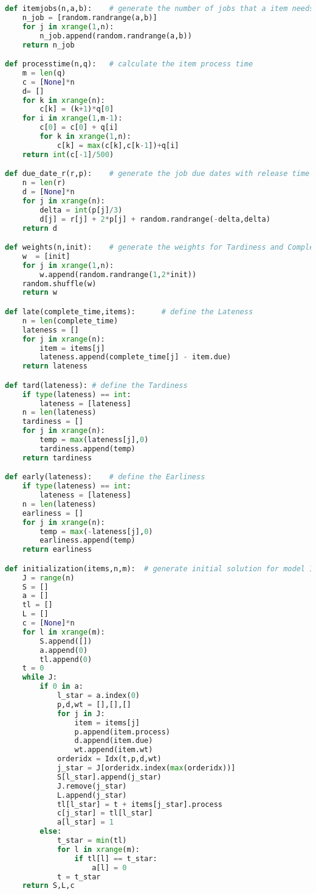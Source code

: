 \begin{lstlisting}[language = Python]
def itemjobs(n,a,b):	# generate the number of jobs that a item needs
	n_job = [random.randrange(a,b)]
	for j in xrange(1,n):
		n_job.append(random.randrange(a,b))
	return n_job

def processtime(n,q):	# calculate the item process time
	m = len(q)
	c = [None]*n
	d= []
	for k in xrange(n):
		c[k] = (k+1)*q[0]
	for i in xrange(1,m-1):
		c[0] = c[0] + q[i]
		for k in xrange(1,n):
			c[k] = max(c[k],c[k-1])+q[i]
	return int(c[-1]/500)

def due_date_r(r,p):	# generate the job due dates with release time
	n = len(r)
	d = [None]*n
	for j in xrange(n):
		delta = int(p[j]/3)
		d[j] = r[j] + 2*p[j] + random.randrange(-delta,delta)
	return d

def weights(n,init):	# generate the weights for Tardiness and Completion, just input the initial value
	w  = [init]
	for j in xrange(1,n):
		w.append(random.randrange(1,2*init))
	random.shuffle(w)
	return w

def late(complete_time,items):		# define the Lateness
	n = len(complete_time)
	lateness = []
	for j in xrange(n):
		item = items[j]
		lateness.append(complete_time[j] - item.due)
	return lateness

def tard(lateness):	# define the Tardiness
	if type(lateness) == int:
		lateness = [lateness]
	n = len(lateness)
	tardiness = []
	for j in xrange(n):
		temp = max(lateness[j],0)
		tardiness.append(temp)
	return tardiness

def early(lateness):	# define the Earliness
	if type(lateness) == int:
		lateness = [lateness]
	n = len(lateness)
	earliness = []
	for j in xrange(n):
		temp = max(-lateness[j],0)
		earliness.append(temp)
	return earliness

def initialization(items,n,m):	# generate initial solution for model 1
	J = range(n)
	S = []
	a = []
	tl = []
	L = []
	c = [None]*n
	for l in xrange(m):
		S.append([])
		a.append(0)
		tl.append(0)
	t = 0
	while J:
		if 0 in a:
			l_star = a.index(0)
			p,d,wt = [],[],[]
			for j in J:				
				item = items[j]
				p.append(item.process)
				d.append(item.due)
				wt.append(item.wt)
			orderidx = Idx(t,p,d,wt)
			j_star = J[orderidx.index(max(orderidx))]
			S[l_star].append(j_star)
			J.remove(j_star)
			L.append(j_star)
			tl[l_star] = t + items[j_star].process
			c[j_star] = tl[l_star]
			a[l_star] = 1
		else:
			t_star = min(tl)
			for l in xrange(m):
				if tl[l] == t_star:
					a[l] = 0
			t = t_star
	return S,L,c


\end{lstlisting}
